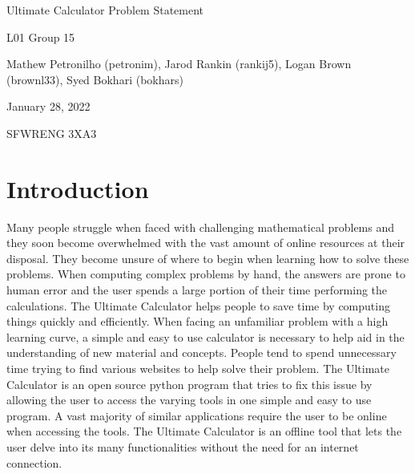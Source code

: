 \documentclass[12pt]{article}
\begin{document}
\begin{titlepage}
   \begin{center}
        \vspace*{5cm}

        \Huge{Ultimate Calculator Problem Statement}

        \vspace{0.5cm}
            
        \vspace{3 cm}
        \Large{L01 Group 15}
       
        \vspace{0.25cm}
        \large{Mathew Petronilho (petronim), Jarod Rankin (rankij5), Logan Brown (brownl33), Syed Bokhari (bokhars)}
       
        \vspace{3 cm}
        \Large{January 28, 2022}
        
        \vspace{0.25 cm}
        \Large{SFWRENG 3XA3}
       

       \vfill
    \end{center}
\end{titlepage}

\setcounter{page}{2}
\pagestyle{fancy}
\fancyhf{}
\rhead{\thepage}

\section*{Introduction}
Many people struggle when faced with challenging mathematical problems and they soon become overwhelmed with the vast amount of online resources at their disposal. They become unsure of where to begin when learning how to solve these problems. When computing complex problems by hand, the answers are prone to human error and the user spends a large portion of their time performing the calculations. The Ultimate Calculator helps people to save time by computing things quickly and efficiently. When facing an unfamiliar problem with a high learning curve, a simple and easy to use calculator is necessary to help aid in the understanding of new material and concepts. People tend to spend unnecessary time trying to find various websites to help solve their problem. The Ultimate Calculator is an open source python program that tries to fix this issue by allowing the user to access the varying tools in one simple and easy to use program. A vast majority of similar applications require the user to be online when accessing the tools. The Ultimate Calculator is an offline tool that lets the user delve into its many functionalities without the need for an internet connection.
\end{document}
